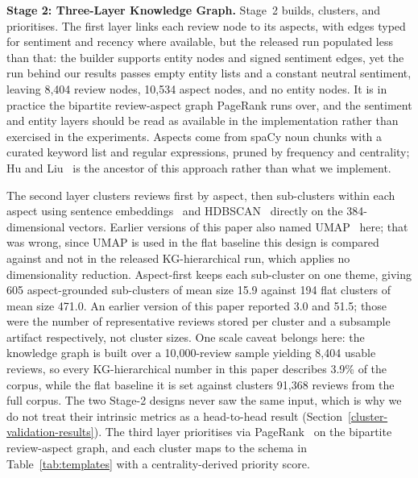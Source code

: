 \documentclass[preprint,12pt]{elsarticle}
\begin{document}
  \textbf{Stage 2: Three-Layer Knowledge Graph.} Stage~2 builds, clusters, and prioritises. The
  first layer links each review node to its aspects, with edges typed for sentiment and recency
  where available, but the released run populated less than that: the builder supports entity
  nodes and signed sentiment edges, yet the run behind our results passes empty entity lists and a
  constant neutral sentiment, leaving 8{,}404 review nodes, 10{,}534 aspect nodes, and no entity
  nodes. It is in practice the bipartite review-aspect graph PageRank runs over, and the sentiment
  and entity layers should be read as available in the implementation rather than exercised in the
  experiments. Aspects come from spaCy noun chunks with a curated keyword list and regular
  expressions, pruned by frequency and centrality; Hu and Liu~\cite{hu2004mining} is the ancestor
  of this approach rather than what we implement.

  The second layer clusters reviews first by aspect, then sub-clusters within each aspect using
  sentence embeddings~\cite{reimers2019sentence} and HDBSCAN~\cite{mcinnes2017hdbscan} directly on
  the 384-dimensional vectors. Earlier versions of this paper also named
  UMAP~\cite{mcinnes2018umap} here; that was wrong, since UMAP is used in the flat baseline this
  design is compared against and not in the released KG-hierarchical run, which applies no
  dimensionality reduction. Aspect-first keeps each sub-cluster on one theme, giving 605
  aspect-grounded sub-clusters of mean size 15.9 against 194 flat clusters of mean size 471.0. An
  earlier version of this paper reported 3.0 and 51.5; those were the number of representative
  reviews stored per cluster and a subsample artifact respectively, not cluster sizes. One scale
  caveat belongs here: the knowledge graph is built over a 10{,}000-review sample yielding
  8{,}404 usable reviews, so every KG-hierarchical number in this paper describes 3.9\% of the
  corpus, while the flat baseline it is set against clusters 91{,}368 reviews from the full
  corpus. The two Stage-2 designs never saw the same input, which is why we do not treat their
  intrinsic metrics as a head-to-head result (Section~\ref{cluster-validation-results}). The third
  layer prioritises via PageRank~\cite{brin1998anatomy, page1999pagerank} on the bipartite
  review-aspect graph, and each cluster maps to the schema in Table~\ref{tab:templates} with a
  centrality-derived priority score.
\end{document}
